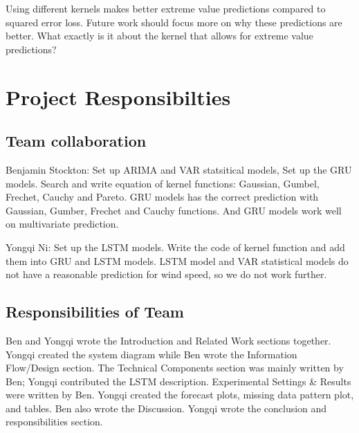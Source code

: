 \documentclass[conference]{IEEEtran}
\begin{document}
Using different kernels makes better extreme value predictions compared to squared error loss. Future work should focus more on why these predictions are better. What exactly is it about the kernel that allows for extreme value predictions?

\section{Project Responsibilties}
\subsection{Team collaboration}

Benjamin Stockton: Set up ARIMA and VAR statsitical models, Set up the GRU models. Search and write equation of kernel functions: Gaussian, Gumbel, Frechet, Cauchy and Pareto. GRU models has the correct prediction with Gaussian, Gumber, Frechet and Cauchy functions. And GRU models work well on multivariate prediction.

Yongqi Ni: Set up the LSTM models. Write the code of kernel function and add them into GRU and LSTM models. LSTM model and VAR statistical models do not have a reasonable prediction for wind speed, so we do not work further. 

\subsection{Responsibilities of Team}

Ben and Yongqi wrote the Introduction and Related Work sections together. Yongqi created the system diagram while Ben wrote the Information Flow/Design section. The Technical Components section was mainly written by Ben; Yongqi contributed the LSTM description. Experimental Settings \& Results were written by Ben. Yongqi created the forecast plots, missing data pattern plot, and tables. Ben also wrote the Discussion. Yongqi wrote the conclusion and responsibilities section.






\end{document}

